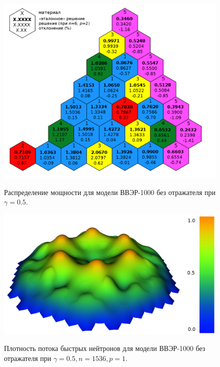 \begin{figure}[H]
	\includegraphics[width=0.75\linewidth]{power_vver_05_6_2.png}\\
	\caption{\label{image:canonsummary}Распределение мощности для модели ВВЭР-1000 без отражателя при $\gamma=0.5$.}
	\label{ris:power5}
\end{figure}

\begin{figure}[H]
	\includegraphics[width=0.85\linewidth]{power7.png}\\
	\caption{\label{image:canonsummary}Плотность потока быстрых нейтронов для модели ВВЭР-1000 без отражателя при $\gamma=0.5, n=1536, p=1$.}
	\label{ris:power7}
\end{figure}

